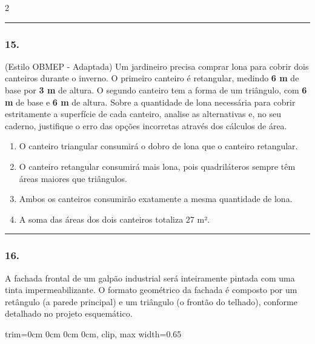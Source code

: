 \documentclass[twoside, 10pt, a4paper]{article}
\newlength{\espacoPreQuestao}\setlength{\espacoPreQuestao}{0.1cm}
\newlength{\espacoQuestao}\setlength{\espacoQuestao}{0.2cm}
\newlength{\espacoAlt}\setlength{\espacoAlt}{0.2cm}
\begin{document}
\begin{multicols*}{2}
\noindent\textcolor{CorLinha}{\rule{\linewidth}{0.5pt}} 
\par\vspace{\espacoPreQuestao}
\subsubsection*{15.} (Estilo OBMEP - Adaptada) Um jardineiro precisa comprar lona para cobrir dois canteiros durante o inverno. O primeiro canteiro é retangular, medindo \textbf{6 m} de base por \textbf{3 m} de altura. O segundo canteiro tem a forma de um triângulo, com \textbf{6 m} de base e \textbf{6 m} de altura. Sobre a quantidade de lona necessária para cobrir estritamente a superfície de cada canteiro, analise as alternativas e, no seu caderno, justifique o erro das opções incorretas através dos cálculos de área.
\begin{enumerate}[label=\alph*), itemsep=\espacoAlt]
    \item O canteiro triangular consumirá o dobro de lona que o canteiro retangular.
    \item O canteiro retangular consumirá mais lona, pois quadriláteros sempre têm áreas maiores que triângulos.
    \item Ambos os canteiros consumirão exatamente a mesma quantidade de lona.
    \item A soma das áreas dos dois canteiros totaliza 27 m².
\end{enumerate}
\par\vspace{\espacoQuestao}

\noindent\textcolor{CorLinha}{\rule{\linewidth}{0.5pt}} 
\par\vspace{\espacoPreQuestao}
\subsubsection*{16.} A fachada frontal de um galpão industrial será inteiramente pintada com uma tinta impermeabilizante. O formato geométrico da fachada é composto por um retângulo (a parede principal) e um triângulo (o frontão do telhado), conforme detalhado no projeto esquemático.

\begin{center}
\begin{adjustbox}{trim=0cm 0cm 0cm 0cm, clip, max width=0.65\linewidth}
\end{adjustbox}
\end{center}
\end{multicols*}
\end{document}
